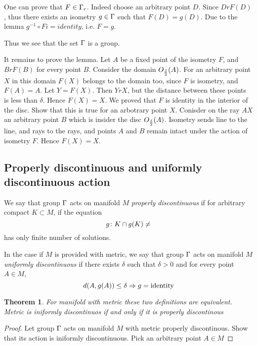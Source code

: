 \documentclass[12pt]{article}
\theoremstyle{theorem}
\newtheorem{thm}{Theorem}
\theoremstyle{lemma}
\numberwithin{equation}{section}
\begin{document}
One can prove that $F\in{\Gamma}_r$. Indeed 
choose an arbitrary point $D$.
Since $DrF(D)$, thus there exists an isometry
$g\in {\Gamma}$ such that $F(D)=g(D)$. 
 Due to the lemma $g^{-1}\circ Fi=identity$, i.e. $F=g$.

Thus we see that the set ${\Gamma}$ is a group.

 It remains to  prove the lemma.
Let $A$ be a fixed point of the isometry $F$,
and $BrF(B)$ for every point $B$. Consider
the domain $O_{\delta\over 2}(A)$. 
For an arbitrary
point $X$ in this  domain $F(X)$ belongs to the domain too,
since $F$ is isometry, and $F(A)=A$. Let $Y=F(X)$.
Then $YrX$, but the distance between these points is less than 
$\delta$. Hence $F(X)=X$.  We proved that $F$ is identity in
the interior of the disc.  Show that this is true for an arbotrary
point $X$. Conisder on the ray $AX$ an arbitrary point $B$
which is insider the disc $O_{\delta\over 2}(A)$.
Isometry sends line to the line, and rays to the rays, and
points $A$ and $B$ remain intact under the action of isometry
  $F$.  Hence $F(X)=X$.

\subsection{Properly discontinuous and uniformly 
discontinuous action}
   We say that group ${\Gamma}$ acts on manifold $M$ {\it properly discontinuous}
if for arbitrary compact $K\subset M$, if the equation
           \begin{equation*}
     g\colon   K\cap g(K)\not=\empty                
           \end{equation*}
has only finite number of solutions.

\smallskip

  In the case if $M$ is provided with metric,
    we say that group ${\Gamma}$ acts on manifold $M$ {\it uniformly 
discontinuous} if there exists $\delta$ such that $\delta>0$
and for every point $A\in M$,
           \begin{equation*}
        d(A, g(A))\leq \delta \Rightarrow g={\rm identity}
            \end{equation*}


\begin{thm}
For manifold with metric these two definitions are equivalent.
  Metric is iniformly discontinuos if and only if it is properly
discontinous
\end{thm}

\begin{proof}
 Let group ${\Gamma}$ acts on manifold $M$ with metric properly discontinous.
  Show that its action is iniformly discontinuous.
  Pick an arbitrary point $A\in M$
\end{proof}
\end{document}
